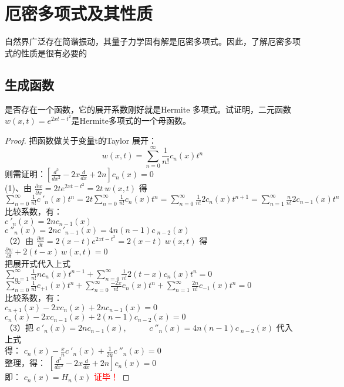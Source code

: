
\section{厄密多项式及其性质}
自然界广泛存在简谐振动，其量子力学固有解是厄密多项式。因此，了解厄密多项式的性质是很有必要的
\subsection{生成函数}
\begin{example} %
是否存在一个函数，它的展开系数刚好就是Hermite 多项式。试证明，二元函数$w(x,t)=e^{2xt-t^2}$是Hermite多项式的一个母函数。\\
\end{example}

\begin{proof}
把函数做关于变量t的Taylor 展开：
 \begin{equation*}
w(x,t) =\sum_{n=0}^{\infty} \frac{1}{n!}  c_n(x) t^n
\end{equation*}
则需证明：$\displaystyle \left[  \frac{d^2}{dx^2} -2x\frac{d}{dx} +2n  \right] c_n(x)=0$ \\
 (1)、由 $ \displaystyle  \frac{\partial w}{\partial x} =2t e^{2xt-t^2} =2t ~w(x,t) $ 得 \\ 
$ \displaystyle \sum_{n=0}^{\infty} \frac{1}{n!}  c~'_n(x) t^n  = 2t  \sum_{n=0}^{\infty} \frac{1}{n!}  c_n(x) t^n  =  \sum_{n=0}^{\infty} \frac{1}{n!}  2c_{n}(x) t^{n+1} =  \sum_{n=1}^{\infty} \frac{n}{n!}  2c_{n-1}(x) t^{n}   $ \\
比较系数，有：\\
{ $c~'_n(x)=2nc_{n-1}(x)$} \\  
$c~''_n(x)=2nc~'_{n-1}(x)=4n(n-1)c~_{n-2}(x)$ \\  
（2）由 $ \displaystyle  \frac{\partial w}{\partial t} =2(x-t) e^{2xt-t^2} =2(x-t) ~w(x,t) $ 得 \\ 
$ \displaystyle  \frac{\partial w}{\partial t} +2(t-x) ~w(x,t) =0$ \\ 
把展开式代入上式\\ 
{$ \displaystyle \sum_{n=1}^{\infty} \frac{1}{n!}n c_n(x) t^{n-1} +\sum_{n=0}^{\infty} \frac{1}{n!}2(t-x) c_n(x)t^n=0$ } \\ \vspace{0.3cm}
{$ \displaystyle \sum_{n=0}^{\infty} \frac{1}{n!} c_{+1}(x) t^{n} +\sum_{n=0}^{\infty} \frac{-2x}{n!} c_n(x)t^n +\sum_{n=1}^{\infty}\frac{2n}{n!} c_{-1}(x)t^n=0$ } \\ 
比较系数，有：\\
{  $ c_{n+1}(x) -2xc_n(x) +2nc_{n-1} (x) =0 $} \\ 
{  $ c_{n}(x) -2xc_{n-1}(x) +2(n-1)c_{n-2} (x) =0 $} \\ 
（3）把 {  $c~'_n(x)=2nc_{n-1}(x)$},~~~~~{  $c~''_n(x)=4n(n-1)c~_{n-2}(x)$} 代入上式 \\  
得：{ $ \displaystyle  c_{n}(x) - \frac{x}{n}c~'_{n}(x) +\frac{1}{2n}c~''_{n} (x) =0 $} \\
整理，得：{ $\displaystyle \left[  \frac{d^2}{dx^2} -2x\frac{d}{dx} +2n  \right] c_n(x)=0$} \\ 
即： $c_n(x)=H_n(x)  $ \textcolor{red}{证毕！}
\end{proof}

